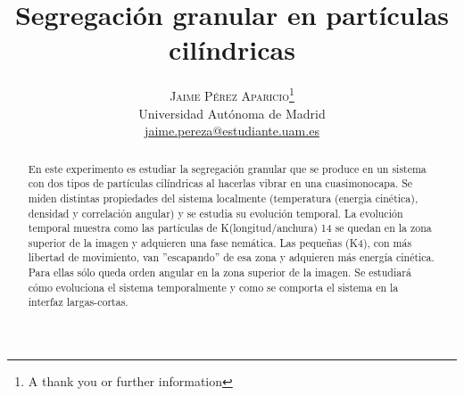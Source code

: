 \documentclass[twoside]{article}
\title{\vspace{-15mm}\fontsize{24pt}{10pt}\selectfont\textbf{Segregaci\'on granular en part\'iculas cil\'indricas}} %
\author{
\large
\textsc{Jaime P\'erez Aparicio}\thanks{A thank you or further information}\\[2mm] %
\normalsize Universidad Aut\'onoma de Madrid \\ %
\normalsize \href{mailto:jaime.pereza@estudiante.uam.es}{jaime.pereza@estudiante.uam.es} %
\vspace{-5mm}
}
\date{}
\begin{document}
\maketitle %

\thispagestyle{fancy} %


\begin{abstract}

\noindent En este experimento es estudiar la segregaci\'on granular que se produce en un sistema con dos tipos de part\'iculas cil\'indricas al hacerlas vibrar en una cuasimonocapa. Se miden distintas propiedades del sistema localmente (temperatura (energia cin\'etica), densidad y correlaci\'on angular) y se estudia su evoluci\'on temporal. La evoluci\'on temporal muestra como las part\'iculas de K(longitud/anchura) 14 se quedan en la zona superior de la imagen y adquieren una fase nem\'atica. Las peque\~nas (K4), con m\'as libertad de movimiento, van ''escapando'' de esa zona y adquieren m\'as energ\'ia cin\'etica. Para ellas s\'olo queda orden angular en la zona superior de la imagen. Se estudiar\'a c\'omo evoluciona el sistema temporalmente y como se comporta el sistema en la interfaz largas-cortas.

\end{abstract}

\end{document}

